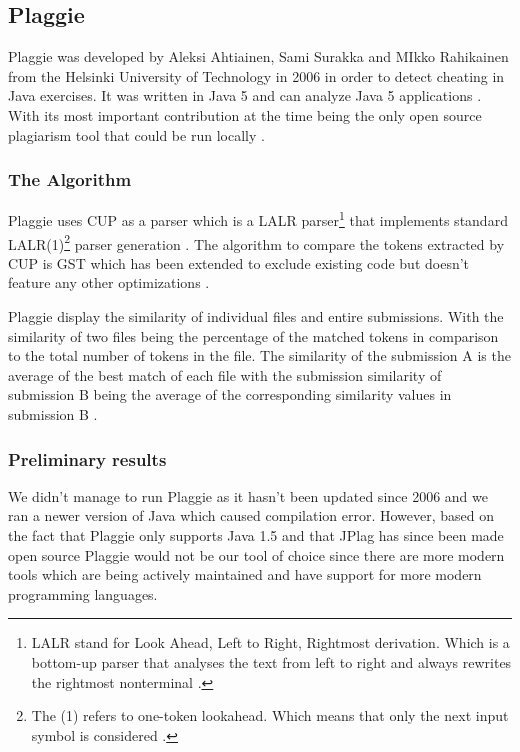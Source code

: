 \documentclass[a4paper, 11pt]{article}
\renewcommand{\\}{\vspace*{0.5\baselineskip} \newline}
\begin{document}
\newpage

\subsection{Plaggie}

Plaggie was developed by Aleksi Ahtiainen, Sami Surakka and MIkko Rahikainen from the Helsinki University of Technology in 2006 in order to detect cheating in
Java exercises. It was written in Java 5 and can analyze Java 5 applications \autocite[3. Current list of features]{RMP}. With its most important
contribution at the time being the only open source plagiarism tool that could be run locally \autocite[p. 141]{PLAGGIE}.

\subsubsection{The Algorithm}

Plaggie uses CUP as a parser which is a LALR parser\footnote{LALR stand for Look Ahead, Left to Right, Rightmost derivation. Which is a bottom-up parser that analyses the text from left to right and always rewrites the rightmost nonterminal \autocite{ICD}.}
that implements standard LALR(1)\footnote{The (1) refers to one-token lookahead. Which means that only the next input symbol is considered \autocite{ICD}.} parser generation \autocite{CUP}. The algorithm to compare
the tokens extracted by CUP is GST which has been extended to exclude existing code but doesn't feature any other optimizations \autocite[4. Algorithm used]{RMP}.

Plaggie display the similarity of individual files and entire submissions. With the similarity of two files being the percentage of the matched tokens
in comparison to the total number of tokens in the file. The similarity of the submission A is the average of the best match of each file with the
submission similarity of submission B being the average of the corresponding similarity values in submission B \autocite*[4. Algorithm used]{RMP}. 

\subsubsection{Preliminary results}

We didn't manage to run Plaggie as it hasn't been updated since 2006 and we ran a newer version of Java which caused compilation error. However, based
on the fact that Plaggie only supports Java 1.5 and that JPlag has since been made open source Plaggie would not be our tool of choice since there are
more modern tools which are being actively maintained and have support for more modern programming languages.
\end{document}
